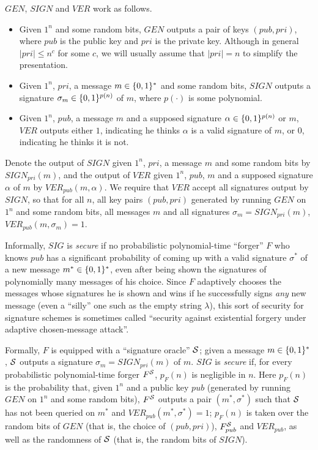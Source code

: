 \medskip\noindent
$GEN$, $SIGN$ and $VER$ work as follows.

\begin{itemize}
\item Given $1^n$ and some random bits, 
$GEN$ outputs a pair of keys $(pub,pri)$, where $pub$ is the public key and
$pri$ is the private key. Although in general $|pri| \leq n^c$ for
some $c$,  we will usually assume that $|pri| = n$ to simplify the presentation.

\item Given $1^n$, $pri$, a message $m \in \{0,1\}^{*}$ and some
random bits, $SIGN$ outputs a signature $\sigma_m \in \{0,1\}^{p(n)}$ of $m$,
where $p(\cdot)$ is some polynomial. 

\item Given $1^n$, $pub$, a message $m$ and a supposed signature 
$\alpha \in \{0,1\}^{p(n)}$ or $m$, $VER$ outputs either $1$,
indicating he thinks $\alpha$ is a valid signature of $m$, or $0$, indicating
he thinks it is not.

\end{itemize}
Denote the output of $SIGN$ given $1^n$, $pri$, a message $m$ and some random
bits by $SIGN_{pri}(m)$, and the output of $VER$ given $1^n$, $pub$, $m$ and a
supposed signature $\alpha$ of $m$ by $VER_{pub}(m,\alpha)$.  We require that
$VER$ accept all signatures output by $SIGN$, so that for all $n$, all key
pairs $(pub,pri)$ generated by running $GEN$ on $1^n$ and some random bits,
all messages $m$ and all signatures $\sigma_m = SIGN_{pri}(m)$,
$VER_{pub}(m,\sigma_m) = 1$.

Informally, $SIG$ is {\it secure} if no probabilistic polynomial-time
``forger'' $F$ who knows $pub$ has a significant probability of coming up with
a valid signature $\sigma^*$ of a new message $m^* \in \{0,1\}^{*}$, even 
after being shown the signatures of polynomially many messages of his choice.
Since $F$ adaptively chooses the messages whose signatures he is shown and
wins if he successfully signs {\it any} new message (even a ``silly'' one such
as the empty string $\lambda$), this sort of security for signature schemes is sometimes called
``security against existential forgery under adaptive chosen-message attack''. 

Formally, $F$ is equipped with a ``signature oracle'' $\mathcal{S}$; given a message
$m \in \{0,1\}^{*}$, $\mathcal{S}$ outputs a signature $\sigma_m = SIGN_{pri}(m)$ of
$m$.  $SIG$ is {\it secure} if, for every probabilistic polynomial-time forger
$F^{\mathcal{S}}$, $p_F(n)$ is negligible in $n$. Here $p_F(n)$ is the probability
that, given $1^n$ and a public key $pub$ (generated by running $GEN$ on $1^n$
and some random bits), $F^{\mathcal{S}}$ outputs a pair $(m^*,\sigma^*)$ such that
$\mathcal{S}$ has not been queried on $m^*$ and $VER_{pub}(m^*,\sigma^*) = 1$;
$p_F(n)$ is taken over the random bits of $GEN$ (that is, the choice of
$(pub,pri)$), $F^{\mathcal{S}}_{pub}$ and $VER_{pub}$, as well as the randomness of
$\mathcal{S}$ (that is, the random bits of $SIGN$).

